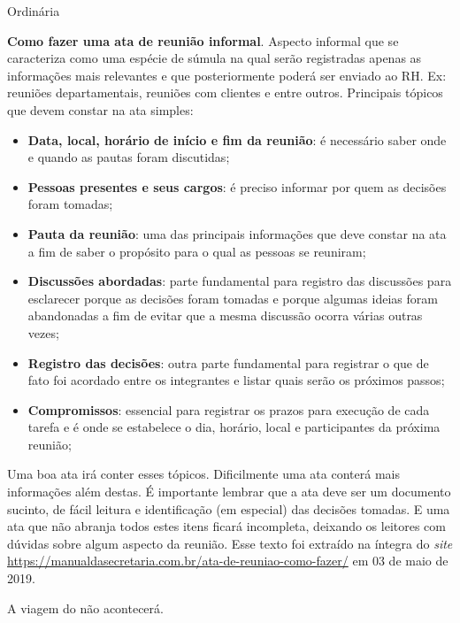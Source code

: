 \documentclass[11pt]{ata}
\date{03 de dezembro de 2019}
\begin{document}
\begin{reuniao}{Ordinária} %

\begin{informes}
\item \textbf{Como fazer uma ata de reunião informal}. Aspecto informal que se caracteriza como uma espécie de súmula na qual serão registradas apenas as informações mais relevantes e que posteriormente poderá ser enviado ao RH. Ex: reuniões departamentais, reuniões com clientes e entre outros. Principais tópicos que devem constar na ata simples:
\begin{itemize}
    \item \textbf{Data, local, horário de início e fim da reunião}: é necessário saber onde e quando as pautas foram discutidas;
    \item \textbf{Pessoas presentes e seus cargos}: é preciso informar por quem as decisões foram tomadas;
    \item \textbf{Pauta da reunião}: uma das principais informações que deve constar na ata a fim de saber o propósito para o qual as pessoas se reuniram;
    \item \textbf{Discussões abordadas}: parte fundamental para registro das discussões para esclarecer porque as decisões foram tomadas e porque algumas ideias foram abandonadas a fim de evitar que a mesma discussão ocorra várias outras vezes;
    \item \textbf{Registro das decisões}: outra parte fundamental para registrar o que de fato foi acordado entre os integrantes e listar quais serão os próximos passos;
    \item \textbf{Compromissos}: essencial para registrar os prazos para execução de cada tarefa e é onde se estabelece o dia, horário, local e participantes da próxima reunião;
\end{itemize}
Uma boa ata irá conter esses tópicos. Dificilmente uma ata conterá mais informações além destas. É importante lembrar que a ata deve ser um documento sucinto, de fácil leitura e identificação (em especial) das decisões tomadas. E uma ata que não abranja todos estes itens ficará incompleta, deixando os leitores com dúvidas sobre algum aspecto da reunião. Esse texto foi extraído na íntegra do \textit{site} \url{https://manualdasecretaria.com.br/ata-de-reuniao-como-fazer/} em 03 de maio de 2019.

\item A viagem do  não acontecerá.
\end{informes}


\end{reuniao}
\end{document}
